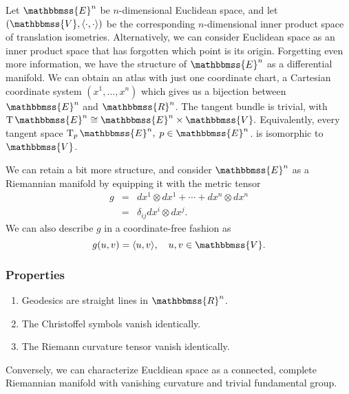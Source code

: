 \documentclass[12pt]{article}
\newcommand{\En}{\mathbbmss{E}^n}
\newcommand{\V}{\mathbbmss{V}}
\newcommand{\R}{\mathbbmss{R}}
\newcommand{\T}{\operatorname{T}}
\begin{document}
Let $\En$ be $n$-dimensional Euclidean space, and let $(\V,\langle
\cdot, \cdot\rangle)$ be the corresponding $n$-dimensional
inner product space of translation isometries.  Alternatively, we can
consider Euclidean space as an inner product space that has forgotten
which point is its origin.  Forgetting even more information, we have
the structure of $\En$ as a differential manifold.  We can obtain an
atlas with just one coordinate chart, a Cartesian coordinate system
$(x^1,\ldots,x^n)$ which gives us a bijection between $\En$ and $\R^n$.  The
tangent bundle is trivial, with $\T\En \cong \En \times \V.$
Equivalently, every tangent space $\T_p\En,\; p\in \En$. is isomorphic
to $\V$.

We can retain a bit more structure, and consider $\En$ as a Riemannian
manifold by equipping it with the metric tensor
\begin{eqnarray*}
g &=& dx^1 \otimes dx^1 + \cdots + dx^n \otimes dx^n \\
&=& \delta_{ij} dx^i \otimes dx^j.
\end{eqnarray*}
We can also describe $g$ in a coordinate-free fashion as
\[ g(u,v) = \langle u,v\rangle,\quad u,v\in \V.\] 
\subsubsection*{Properties}
\begin{enumerate}
\item Geodesics are straight lines in $\R^n$.
\item The Christoffel symbols vanish identically.
\item The Riemann curvature tensor vanish identically.
\end{enumerate}
Conversely, we can
characterize Eucldiean space as a connected, complete Riemannian
manifold with vanishing curvature and trivial fundamental group.
\end{document}
